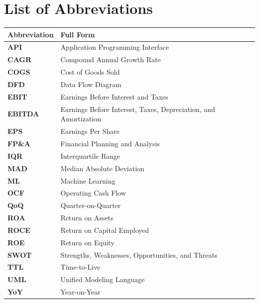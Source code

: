 \documentclass[12pt,oneside]{report}
\begin{document}
\newpage
{}
{}
\listoffigures

\newpage
{}
{}
\listoftables

\newpage
{}
\chapter*{List of Abbreviations}
\begin{center}
    \begin{tabular}{ll}
        \toprule
        \textbf{Abbreviation} & \textbf{Full Form} \\
        \midrule
        \textbf{API} & Application Programming Interface \\
        \textbf{CAGR} & Compound Annual Growth Rate \\
        \textbf{COGS} & Cost of Goods Sold \\
        \textbf{DFD} & Data Flow Diagram \\
        \textbf{EBIT} & Earnings Before Interest and Taxes \\
        \textbf{EBITDA} & Earnings Before Interest, Taxes, Depreciation, and Amortization \\
        \textbf{EPS} & Earnings Per Share \\
        \textbf{FP\&A} & Financial Planning and Analysis \\
        \textbf{IQR} & Interquartile Range \\
        \textbf{MAD} & Median Absolute Deviation \\
        \textbf{ML} & Machine Learning \\
        \textbf{OCF} & Operating Cash Flow \\
        \textbf{QoQ} & Quarter-on-Quarter \\
        \textbf{ROA} & Return on Assets \\
        \textbf{ROCE} & Return on Capital Employed \\
        \textbf{ROE} & Return on Equity \\
        \textbf{SWOT} & Strengths, Weaknesses, Opportunities, and Threats \\
        \textbf{TTL} & Time-to-Live \\
        \textbf{UML} & Unified Modeling Language \\
        \textbf{YoY} & Year-on-Year \\
        \bottomrule
    \end{tabular}
\end{center}
\end{document}
